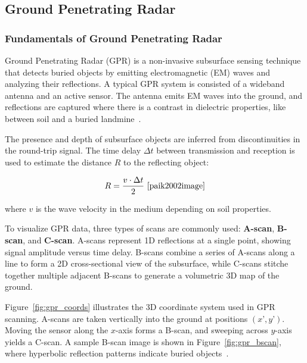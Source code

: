 \subsection{Ground Penetrating Radar}

\subsubsection{Fundamentals of Ground Penetrating Radar}

Ground Penetrating Radar (GPR) is a non-invasive subsurface sensing technique that detects buried objects by emitting electromagnetic (EM) waves and analyzing their reflections. A typical GPR system is consisted of a wideband antenna and an active sensor. The antenna emits EM waves into the ground, and reflections are captured where there is a contrast in dielectric properties, like between soil and a buried landmine~\cite{paik2002image}.

The presence and depth of subsurface objects are inferred from discontinuities in the round-trip signal. The time delay $\Delta t$ between transmission and reception is used to estimate the distance $R$ to the reflecting object:

\[
R = \frac{v \cdot \Delta t}{2} ~\cite{paik2002image}
\]

where $v$ is the wave velocity in the medium depending on soil properties.

To visualize GPR data, three types of scans are commonly used: \textbf{A-scan}, \textbf{B-scan}, and \textbf{C-scan}. A-scans represent 1D reflections at a single point, showing signal amplitude versus time delay. B-scans combine a series of A-scans along a line to form a 2D cross-sectional view of the subsurface, while C-scans stitche together multiple adjacent B-scans to generate a volumetric 3D map of the ground. 

Figure~\ref{fig:gpr_coords} illustrates the 3D coordinate system used in GPR scanning. A-scans are taken vertically into the ground at positions $(x’, y’)$. Moving the sensor along the $x$-axis forms a B-scan, and sweeping across $y$-axis yields a C-scan. A sample B-scan image is shown in Figure~\ref{fig:gpr_bscan}, where hyperbolic reflection patterns indicate buried objects~\cite{paik2002image}.

